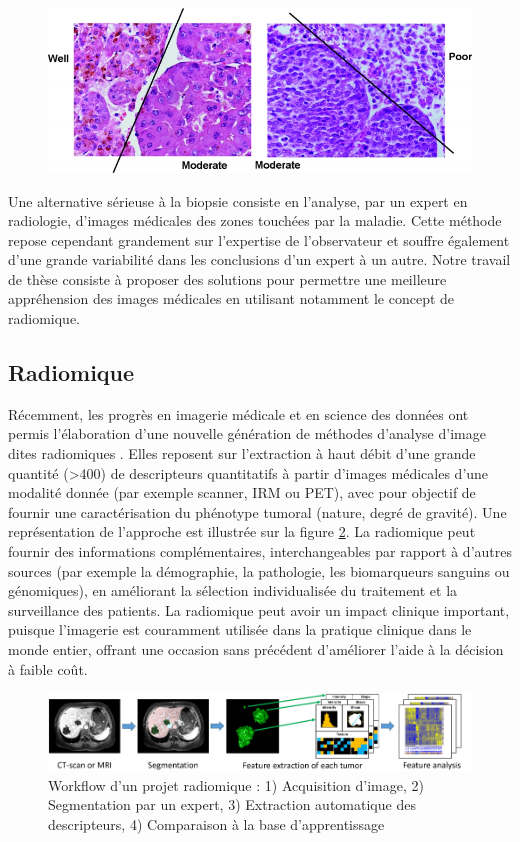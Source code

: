 \documentclass[]{memoir}
\begin{document}
\begin{figure}
\centering
\includegraphics[width=0.7\linewidth]{../HistologicalGradePrediction/images/pawlik_fig4}
\label{fig:pawlik_fig4}
\end{figure}

Une alternative sérieuse à la biopsie consiste en l’analyse, par un expert en radiologie, d’images médicales des zones touchées par la maladie. Cette méthode repose cependant grandement sur l’expertise de l’observateur et souffre également d’une grande variabilité dans les conclusions d’un expert à un autre. 
Notre travail de thèse consiste à proposer des solutions pour permettre une meilleure appréhension des images médicales en utilisant notamment le concept de radiomique.
  
\subsection{Radiomique}

Récemment, les progrès en imagerie médicale et en science des données ont permis l’élaboration d’une nouvelle génération de méthodes d’analyse d’image dites radiomiques \cite{Lambin2012}. Elles reposent sur l’extraction à haut débit d’une grande quantité (>400) de descripteurs quantitatifs \cite{Kumar2012} à partir d’images médicales d’une modalité donnée (par exemple scanner, IRM ou PET), avec pour objectif de fournir une caractérisation du phénotype tumoral (nature, degré de gravité). Une représentation de l’approche est illustrée sur la figure \ref{fig:radiomic}. La radiomique peut fournir des informations complémentaires, interchangeables par rapport à d’autres sources (par exemple la démographie, la pathologie, les biomarqueurs sanguins ou génomiques), en améliorant la sélection individualisée du traitement et la surveillance des patients. La radiomique peut avoir un impact clinique important, puisque l’imagerie est couramment utilisée dans la pratique clinique dans le monde entier, offrant une occasion sans précédent d’améliorer l’aide à la décision à faible coût. 

\begin{figure}
\centering
\includegraphics[width=0.7\linewidth]{images/radiomic}
\caption{Workflow d’un projet radiomique : 1) Acquisition d’image, 2) Segmentation par un expert, 3) Extraction automatique des descripteurs, 4) Comparaison à la base d’apprentissage}
\label{fig:radiomic}
\end{figure}
\end{document}
